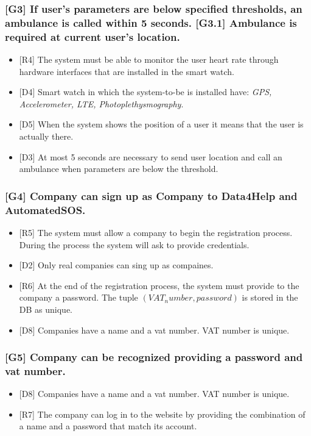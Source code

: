 \documentclass{article}
\begin{document}
\subsubsection{[G3] If user's parameters are below specified thresholds, an ambulance is called within 5 seconds. [G3.1] Ambulance is required at current user's location.}
\begin{itemize}
\item {[R4]} The system must be able to monitor the user heart rate through hardware interfaces that are installed in the smart watch.
\item {[D4]} Smart watch in which the system-to-be is installed have: \emph{GPS, Accelerometer, LTE, Photoplethysmography}.
\item {[D5]} When the system shows the position of a user it means that the user is actually there.
\item {[D3]} At most 5 seconds are necessary to send user location and call an ambulance when parameters are below the threshold.
\end{itemize}
\subsubsection{[G4] Company can sign up as Company to Data4Help and AutomatedSOS.}
\begin{itemize}
\item {[R5]} The system must allow a company to begin the registration process. During the process the system will ask to provide credentials.
\item {[D2]} Only real companies can sing up as compaines.
\item {[R6]} At the end of the registration process, the system must provide to the company a password. The tuple $(VAT_number, password)$ is stored in the DB as unique.
\item {[D8]} Companies have a name and a vat number. VAT number is unique.
\end{itemize}
\subsubsection{[G5] Company can be recognized providing a password and vat number.}
\begin{itemize}
\item {[D8]} Companies have a name and a vat number. VAT number is unique.
\item {[R7]} The company can log in to the website by providing the combination of a name and a password that match its account.
\end{itemize}
\end{document}
